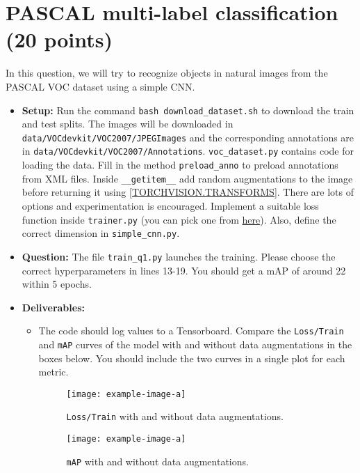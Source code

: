 \documentclass[11pt,addpoints,answers]{exam}
\numberwithin{equation}{section} %
\numberwithin{figure}{section} %
\numberwithin{table}{section} %
\begin{document}
\section{PASCAL multi-label classification (20 points)}
In this question, we will try to recognize objects in natural images from the PASCAL VOC dataset using a simple CNN.
\begin{itemize}
    \item \textbf{Setup:}  Run the command \texttt{bash download\_dataset.sh} to download the train and test splits. The images will be downloaded in 
\texttt{data/VOCdevkit/VOC2007/JPEGImages} and the corresponding annotations are in \texttt{data/VOCdevkit/VOC2007/Annotations}. \texttt{voc\_dataset.py} contains code for loading the data. Fill in the method \texttt{preload\_anno} to preload annotations from XML files. Inside \texttt{\_\_getitem\_\_} add random augmentations to the image before returning it using \href{https://pytorch.org/vision/stable/transforms.html}{[TORCHVISION.TRANSFORMS]}. There are lots of options and experimentation is encouraged. Implement a suitable loss function inside \texttt{trainer.py} (you can pick one from \href{https://pytorch.org/docs/stable/nn.html#loss-functions}{here}). Also, define the correct dimension in \texttt{simple\_cnn.py}. 
\item \textbf{Question:} The file \texttt{train\_q1.py} launches the training. Please choose the correct hyperparameters in lines 13-19. You should get a mAP of around 22 within 5 epochs.
\item \textbf{Deliverables:} 
    \begin{itemize}
        \item The code should log values to a Tensorboard. Compare the \texttt{Loss/Train} and \texttt{mAP} curves of the model with and without data augmentations in the boxes below. You should include the two curves in a single plot for each metric.

        \begin{figure}[H]
            \centering
            \texttt{[image: example-image-a]}
            \caption{\texttt{Loss/Train} with and without data augmentations.}
            \label{fig:q1_1_compare_loss}
        \end{figure}
        
        \begin{figure}[H]
            \centering
            \texttt{[image: example-image-a]}
            \caption{\texttt{mAP} with and without data augmentations.}
            \label{fig:q1_1_compare_map}
        \end{figure}
        

\end{itemize}
\end{itemize}
\end{document}
